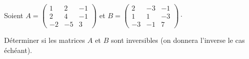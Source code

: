 \documentclass[a4paper,10pt]{report}
\begin{document}
\begin{Exemple}
%
%

\vspace{13cm}
\end{Exemple}

\begin{ApplicationDirecte} Soient $A = \begin{pmatrix} 1 & 2 & -1\\
2 & 4 & -1\\
-2 & -5 & 3
\end{pmatrix}$ et $ B = \begin{pmatrix}
                   2 & -3 & -1\\
1 & 1 & -3\\
-3 & -1 & 7
                  \end{pmatrix}\cdot$
                  
Déterminer si les matrices $A$ et $B$ sont inversibles (on donnera l'inverse le cas échéant).
\end{ApplicationDirecte}
\end{document}

